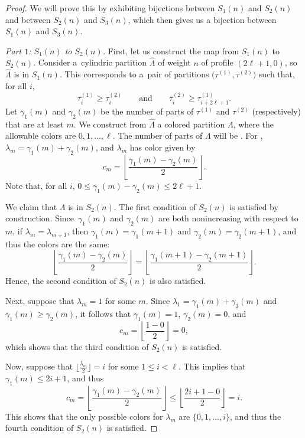 \documentclass[10pt,a4paper]{amsart}
\numberwithin{equation}{section}
\theoremstyle{definition}
\newcommand{\LH}{{\widehat{\Lambda}}}
\begin{document}
\begin{proof}
We will prove this by exhibiting bijections between $S_1(n)$ and $S_2(n)$ and between $S_2(n)$ and $S_3(n)$, which then gives us a bijection between $S_1(n)$ and $S_3(n)$.

{\it Part $1$: $S_1(n)$ to $S_2(n)$.} First, let us construct the map from $S_1(n)$ to $S_2(n)$. Consider a~cylindric partition $\LH$ of weight $n$ of profile $(2\ell+1,0)$, so $\LH$ is in $S_1(n)$. This corresponds to a~pair of partitions $\bigl(\tau^{(1)},\tau^{(2)}\bigr)$ such that, for all $i$,
\begin{equation*}
\tau_i^{(1)} \ge \tau_i^{(2)} \qquad \text{and}\qquad \tau_i^{(2)} \ge \tau_{i+2\ell+1}^{(1)}.
\end{equation*}
Let $\gamma_1(m)$ and $\gamma_2(m)$ be the number of parts of $\tau^{(1)}$ and $\tau^{(2)}$ (respectively) that are at least $m$. We construct from $\LH$ a colored partition $\Lambda$, where the allowable colors are $0,1,\dots,\ell$. The number of parts of $\Lambda$ will be . For , $\lambda_m = \gamma_1(m)+\gamma_2(m)$, and $\lambda_m$ has color given by \[c_m=\left\lfloor\frac{\gamma_1(m)-\gamma_2(m)}2\right\rfloor.\] Note that, for all $i$, $0 \le \gamma_1(m)-\gamma_2(m) \le 2\ell+1$.

We claim that $\Lambda$ is in $S_2(n)$. The first condition of $S_2(n)$ is satisfied by construction. Since~$\gamma_1(m)$ and $\gamma_2(m)$ are both nonincreasing with respect to $m$, if $\lambda_{m}=\lambda_{m+1}$, then $\gamma_1(m)=\gamma_1(m+1)$ and $\gamma_2(m)=\gamma_2(m+1)$, and thus the colors are the same:{\samepage
\begin{equation*}
\left\lfloor\frac{\gamma_1(m)-\gamma_2(m)}2\right\rfloor=\left\lfloor\frac{\gamma_1(m+1)-\gamma_2(m+1)}2\right\rfloor.
\end{equation*}
Hence, the second condition of $S_2(n)$ is also satisfied.}

Next, suppose that $\lambda_m=1$ for some $m$. Since $\lambda_1= \gamma_1(m)+\gamma_2(m)$ and $\gamma_1(m)\ge \gamma_2(m)$, it follows that $\gamma_1(m)=1$, $\gamma_2(m)=0$, and
\[ c_m=\left\lfloor\frac{1-0}2\right\rfloor=0,\] which shows that the third condition of $S_2(n)$ is satisfied.

Now, suppose that $\bigl\lfloor\frac{\lambda_m}2\bigr\rfloor=i$ for some $1\le i <\ell$. This implies that $\gamma_1(m)\le 2i+1$, and thus \begin{equation*}
c_m=\left\lfloor\frac{\gamma_1(m)-\gamma_2(m)}2\right\rfloor\le\left\lfloor\frac{2i+1-0}2\right\rfloor=i.
\end{equation*}
This shows that the only possible colors for $\lambda_m$ are $\{0,1,\dots,i\}$, and thus the fourth condition of $S_2(n)$ is satisfied.


\end{proof}
\end{document}
